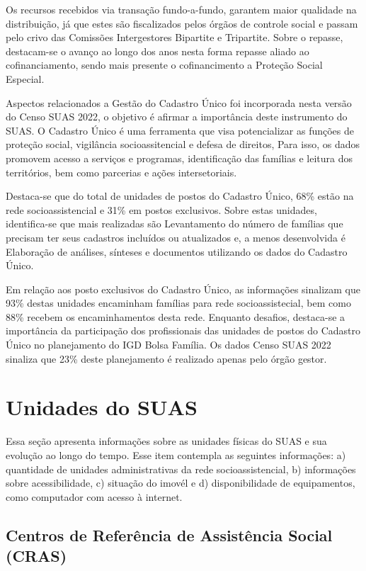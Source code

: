 \documentclass[
  letterpaper,
  DIV=11,
  numbers=noendperiod]{scrreprt}
\begin{document}
Os recursos recebidos via transação fundo-a-fundo, garantem maior
qualidade na distribuição, já que estes são fiscalizados pelos órgãos de
controle social e passam pelo crivo das Comissões Intergestores
Bipartite e Tripartite. Sobre o repasse, destacam-se o avanço ao longo
dos anos nesta forma repasse aliado ao cofinanciamento, sendo mais
presente o cofinancimento a Proteção Social Especial.

Aspectos relacionados a Gestão do Cadastro Único foi incorporada nesta
versão do Censo SUAS 2022, o objetivo é afirmar a importância deste
instrumento do SUAS. O Cadastro Único é uma ferramenta que visa
potencializar as funções de proteção social, vigilância socioassitencial
e defesa de direitos, Para isso, os dados promovem acesso a serviços e
programas, identificação das famílias e leitura dos territórios, bem
como parcerias e ações intersetoriais.

Destaca-se que do total de unidades de postos do Cadastro Único, 68\%
estão na rede socioassistencial e 31\% em postos exclusivos. Sobre estas
unidades, identifica-se que mais realizadas são Levantamento do número
de famílias que precisam ter seus cadastros incluídos ou atualizados e,
a menos desenvolvida é Elaboração de análises, sínteses e documentos
utilizando os dados do Cadastro Único.

Em relação aos posto exclusivos do Cadastro Único, as informações
sinalizam que 93\% destas unidades encaminham famílias para rede
socioassistecial, bem como 88\% recebem os encaminhamentos desta rede.
Enquanto desafios, destaca-se a importância da participação dos
profissionais das unidades de postos do Cadastro Único no planejamento
do IGD Bolsa Família. Os dados Censo SUAS 2022 sinaliza que 23\% deste
planejamento é realizado apenas pelo órgão gestor.


\chapter{Unidades do SUAS}\label{unidades-do-suas}

Essa seção apresenta informações sobre as unidades físicas do SUAS e sua
evolução ao longo do tempo. Esse item contempla as seguintes
informações: a) quantidade de unidades administrativas da rede
socioassistencial, b) informações sobre acessibilidade, c) situação do
imovél e d) disponibilidade de equipamentos, como computador com acesso
à internet.

\section{Centros de Referência de Assistência Social
(CRAS)}\label{centros-de-referuxeancia-de-assistuxeancia-social-cras}
\end{document}
